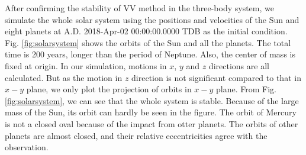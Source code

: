 After confirming the stability of VV method in the three-body system, 
we simulate the whole solar system using the positions and velocities of the Sun and eight planets 
at A.D. 2018-Apr-02 00:00:00.0000 TDB \cite{NASAdata} as the initial condition. 
Fig. \ref{fig:solarsystem} shows the orbits of the Sun and all the planets. 
The total time is 200 years, longer than the period of Neptune. 
Also, the center of mass is fixed at origin. 
In our simulation, motions in $x$, $y$ and $z$ directions are all calculated. 
But as the motion in $z$ direction is not significant compared to that in $x-y$ plane, 
we only plot the projection of orbits in $x-y$ plane. 
From Fig. \ref{fig:solarsystem}, we can see that the whole system is stable. 
Because of the large mass of the Sun, its orbit can hardly be seen in the figure. 
The orbit of Mercury is not a closed oval because of the impact from otter planets. 
The orbits of other planets are almost closed, and their relative eccentricities agree with the observation. 
